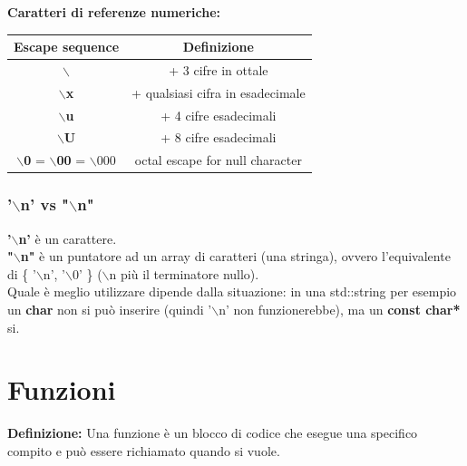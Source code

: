 \textbf{Caratteri di referenze numeriche: } \\

\begin{tabular}{|c|c|}
	\hline
	\textbf{Escape sequence} & \textbf{Definizione} \\
	\hline
	\textsf{\small \textbf{$\backslash$}} & \textsf{\small + 3 cifre in ottale} \\
	\hline
	\textsf{\small \textbf{$\backslash$x}} & \textsf{\small + qualsiasi cifra in esadecimale} \\
	\hline
	\textsf{\small \textbf{$\backslash$u}} & \textsf{\small + 4 cifre esadecimali} \\
	\hline
	\textsf{\small \textbf{$\backslash$U}} & \textsf{\small + 8 cifre esadecimali} \\
	\hline
	\textsf{\small \textbf{$\backslash$0} = \textbf{$\backslash$00} = $\backslash$000} & \textsf{\small octal escape for null character} \\
	\hline
\end{tabular}

\subsubsection{'$\backslash$n' vs "$\backslash$n"}

\textsf{\small \textbf{'$\backslash$n'} è un carattere.} \\

\textsf{\small \textbf{"$\backslash$n"} è un puntatore ad un array di caratteri (una stringa), ovvero l'equivalente di \{ '$\backslash$n', '$\backslash$0' \} ($\backslash$n più il terminatore nullo).} \\

\textsf{\small Quale è meglio utilizzare dipende dalla situazione: in una std::string per esempio un \textbf{char} non si può inserire (quindi '$\backslash$n' non funzionerebbe), ma un \textbf{const char*} si. \label{newline_apici_o_virgolette}} \\


\newpage

\section{Funzioni}

\textsf{\small \textbf{Definizione: } Una funzione è un blocco di codice che esegue una specifico compito e può essere richiamato quando si vuole.} \\


